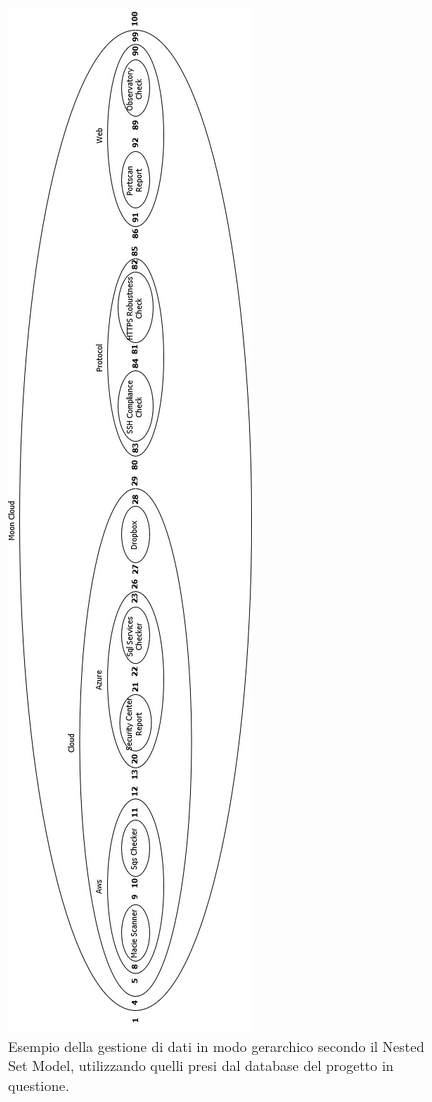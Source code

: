 \begin{figure}
    \centering
    \includegraphics[scale=0.53]{images/MC_Rec_NSM_Container.jpg}
    \caption[Gestione di dati (visione completa) secondo il NSM]{Esempio della gestione di dati in modo gerarchico secondo il Nested Set Model, utilizzando quelli presi dal database del 
    progetto in questione.}
    \label{fig:MC_Rec_NSM_Container}
\end{figure}
%
\newpage
%
